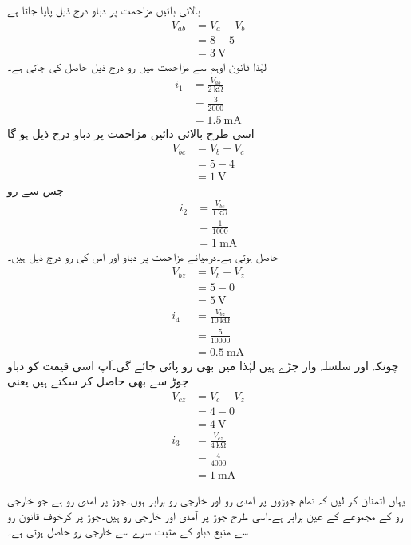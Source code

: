 بالائی بائیں مزاحمت پر دباو درج ذیل پایا جاتا ہے
\begin{align*}
V_{ab}&=V_a-V_b\\
&=8-5\\
&=\SI{3}{\volt}
\end{align*}
لہٰذا قانون اوہم سے مزاحمت میں رو درج ذیل حاصل کی جاتی ہے۔
\begin{align*}
i_1&=\frac{V_{ab}}{\SI{2}{\kilo\ohm}}\\
&=\frac{3}{2000}\\
&=\SI{1.5}{\milli\ampere}
\end{align*}
اسی طرح بالائی دائیں مزاحمت پر دباو  درج ذیل ہو گا
\begin{align*}
V_{bc}&=V_b-V_c\\
&=5-4\\
&=\SI{1}{\volt}
\end{align*}
جس سے رو
\begin{align*}
i_2&=\frac{V_{bc}}{\SI{1}{\kilo\ohm}}\\
&=\frac{1}{1000}\\
&=\SI{1}{\milli\ampere}
\end{align*}
حاصل ہوتی ہے۔درمیانے مزاحمت پر دباو اور اس کی رو درج ذیل ہیں۔
\begin{align*}
V_{bz}&=V_b-V_z\\
&=5-0\\
&={\SI{5}{\volt}}\\
i_4&=\frac{V_{bz}}{\SI{10}{\kilo\ohm}}\\
&=\frac{5}{10000}\\
&=\SI{0.5}{\milli\ampere}
\end{align*}
چونکہ  اور  سلسلہ وار جڑے ہیں لہٰذا  میں بھی  رو پائی جائے گی۔آپ اسی قیمت کو دباو جوڑ سے بھی حاصل کر سکتے ہیں یعنی
\begin{align*}
V_{cz}&=V_c-V_z\\
&=4-0\\
&=\SI{4}{\volt}\\
i_3&=\frac{V_{cz}}{\SI{4}{\kilo\ohm}}\\
&=\frac{4}{4000}\\
&=\SI{1}{\milli\ampere}
\end{align*}

یہاں اتمنان کر لیں کہ تمام جوڑوں پر آمدی رو اور خارجی رو برابر ہوں۔جوڑ  پر آمدی رو  ہے جو خارجی رو کے مجموعے  کے عین برابر ہے۔اسی طرح جوڑ  پر آمدی اور خارجی رو  ہیں۔جوڑ  پر کرخوف قانون رو سے منبع دباو کے مثبت سرے سے خارجی رو  حاصل ہوتی ہے۔

